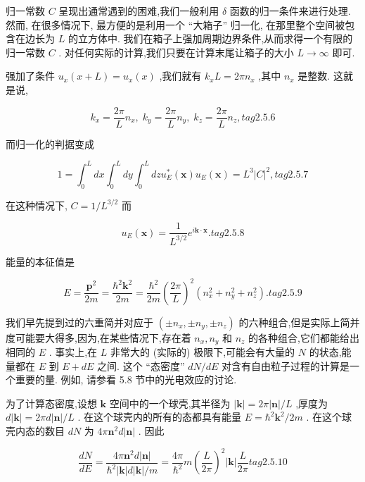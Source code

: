 \documentclass[lang=cn,newtx,10pt,scheme=chinese,thmcnt=section]{elegantbook}
\begin{document}
归一常数 $C$ 呈现出通常遇到的困难,我们一般利用 $\delta$ 函数的归一条件来进行处理. 然而, 在很多情况下, 最方便的是利用一个 “大箱子” 归一化, 在那里整个空间被包含在边长为 $L$ 的立方体中. 我们在箱子上强加周期边界条件,从而求得一个有限的归一常数 $C$ . 对任何实际的计算,我们只要在计算末尾让箱子的大小 $L \rightarrow \infty$ 即可.

强加了条件 ${u}_{x}\left( {x + L}\right) = {u}_{x}\left( x\right)$ ,我们就有 ${k}_{x}L = {2\pi }{n}_{x}$ ,其中 ${n}_{x}$ 是整数. 这就是说,

$$
{k}_{x} = \frac{2\pi }{L}{n}_{x},\;{k}_{y} = \frac{2\pi }{L}{n}_{y},\;{k}_{z} = \frac{2\pi }{L}{n}_{z}, tag{2.5.6}
$$

而归一化的判据变成

$$
1 = {\int }_{0}^{L}{dx}{\int }_{0}^{L}{dy}{\int }_{0}^{L}{dz}{u}_{E}^{ * }\left( \mathbf{x}\right) {u}_{E}\left( \mathbf{x}\right) = {L}^{3}{\left| C\right| }^{2}, tag{2.5.7}
$$

在这种情况下, $C = 1/{L}^{3/2}$ 而

$$
{u}_{E}\left( \mathbf{x}\right) = \frac{1}{{L}^{3/2}}{e}^{i\mathbf{k} \cdot \mathbf{x}}. tag{2.5.8}
$$

能量的本征值是

$$
E = \frac{{\mathbf{p}}^{2}}{2m} = \frac{{\hbar }^{2}{\mathbf{k}}^{2}}{2m} = \frac{{\hbar }^{2}}{2m}{\left( \frac{2\pi }{L}\right) }^{2}\left( {{n}_{x}^{2} + {n}_{y}^{2} + {n}_{z}^{2}}\right) . tag{2.5.9}
$$

我们早先提到过的六重简并对应于 $\left( {\pm {n}_{x}, \pm {n}_{y}, \pm {n}_{z}}\right)$ 的六种组合,但是实际上简并度可能要大得多,因为,在某些情况下,存在着 ${n}_{x},{n}_{y}$ 和 ${n}_{z}$ 的各种组合,它们都能给出相同的 $E$ . 事实上,在 $L$ 非常大的 (实际的) 极限下,可能会有大量的 $N$ 的状态,能量都在 $E$ 到 $E + {dE}$ 之间. 这个 “态密度” ${dN}/{dE}$ 对含有自由粒子过程的计算是一个重要的量. 例如, 请参看 5.8 节中的光电效应的讨论.

为了计算态密度,设想 $\mathbf{k}$ 空间中的一个球壳,其半径为 $\left| \mathbf{k}\right| = {2\pi }\left| \mathbf{n}\right| /L$ ,厚度为 $d\left| \mathbf{k}\right| = {2\pi d}\left| \mathbf{n}\right| /L$ . 在这个球壳内的所有的态都具有能量 $E = {\hbar }^{2}{\mathbf{k}}^{2}/{2m}$ . 在这个球壳内态的数目 ${dN}$ 为 ${4\pi }{\mathbf{n}}^{2}d\left| \mathbf{n}\right|$ . 因此

$$
\frac{dN}{dE} = \frac{{4\pi }{\mathbf{n}}^{2}d\left| \mathbf{n}\right| }{{\hbar }^{2}\left| \mathbf{k}\right| d\left| \mathbf{k}\right| /m} = \frac{4\pi }{{\hbar }^{2}}m{\left( \frac{L}{2\pi }\right) }^{2}\left| \mathbf{k}\right| \frac{L}{2\pi } tag{2. 5.10}
$$
\end{document}
